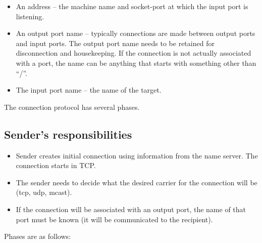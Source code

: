 \documentclass[a4]{article}
\begin{document}
\begin{itemize}

\item An address -- the machine name and socket-port at which
the input port is listening.

\item An output port name -- typically connections are made
between output ports and input ports.  The output port name
needs to be retained for disconnection and housekeeping.
If the connection is not actually associated with a port,
the name can be anything that starts with something
other than ``/''.

\item The input port name -- the name of the target.

\end{itemize}


The connection protocol has several phases.

\subsection{Sender's responsibilities}

\begin{itemize}

\item Sender creates initial connection using information 
from the name server.  The connection starts in TCP.

\item The sender needs to decide what the desired carrier
for the connection will be (tcp, udp, mcast).

\item If the connection will be associated with an output port, the
name of that port must be known (it will be communicated to the
recipient).

\end{itemize}

Phases are as follows:
\end{document}
